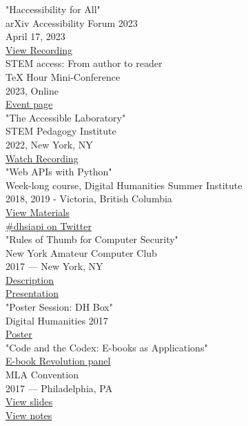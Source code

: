 \documentclass[11pt]{article}
\begin{document}
"Haccessibility for All"\\[0pt]
arXiv Accessibility Forum 2023\\[0pt]
April 17, 2023\\[0pt]
\href{https://www.youtube.com/watch?v=1v3jFCWQfI8}{View Recording}\\[0pt]

STEM access: From author to reader\\[0pt]
\TeX{} Hour Mini-Conference\\[0pt]
2023, Online\\[0pt]
\href{https://texhour.github.io/2023/01/19/stem-access-author-reader/}{Event page}\\[0pt]

"The Accessible Laboratory"\\[0pt]
STEM Pedagogy Institute\\[0pt]
2022, New York, NY\\[0pt]
\href{https://www.youtube.com/watch?v=dnt6rgHlz74}{Watch Recording}\\[0pt]

"Web APIs with Python"\\[0pt]
Week-long course, Digital Humanities Summer Institute\\[0pt]
2018, 2019 - Victoria, British Columbia\\[0pt]
\href{https://github.com/szweibel/DHSI-API-workshop\#web-apis-with-python}{View Materials}\\[0pt]
\href{https://x.com/search?q=\%2523dhsiapi\&src=typd}{\#dhsiapi on Twitter}\\[0pt]

"Rules of Thumb for Computer Security"\\[0pt]
New York Amateur Computer Club\\[0pt]
2017 — New York, NY\\[0pt]
\href{http://nyacc.org/}{Description}\\[0pt]
\href{http://htmlpreview.github.io/?https://github.com/smythp/security-workshop/blob/master/presentation/index.html\#/sec-title-slide}{Presentation}\\[0pt]

"Poster Session: DH Box"\\[0pt]
Digital Humanities 2017\\[0pt]
\href{https://smythp.com/images/dh\_box\_poster.pdf}{Poster}\\[0pt]

"Code and the Codex: E-books as Applications"\\[0pt]
\href{https://apps.mla.org/program\_details?prog\_id=75\&year=2017}{E-book Revolution panel}\\[0pt]
MLA Convention\\[0pt]
2017 — Philadelphia, PA\\[0pt]
\href{http://htmlpreview.github.io/?https://github.com/smythp/ebooks-as-applications/blob/master/presentation.html\#/sec-title-slide}{View slides}\\[0pt]
\href{https://github.com/smythp/ebooks-as-applications\#ebooks-as-applications}{View notes}\\[0pt]
\end{document}
